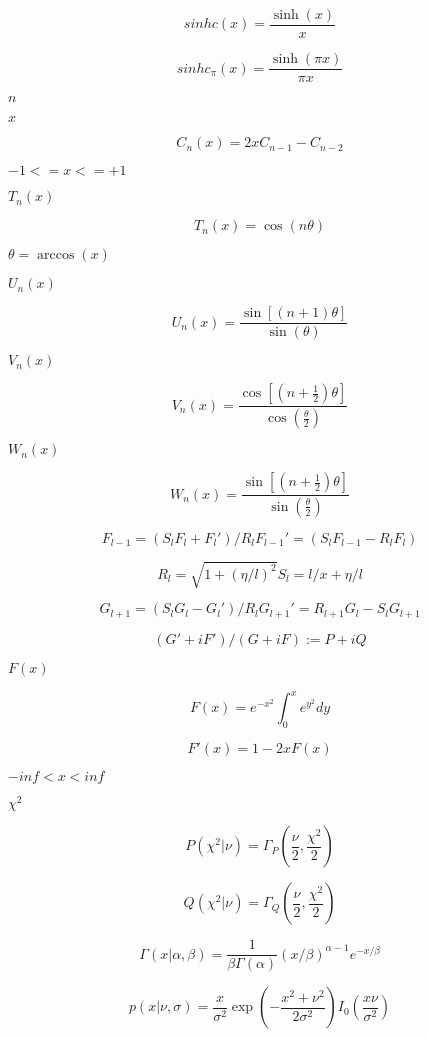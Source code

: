 \documentclass{article}
\begin{document}
\[ sinhc(x) = \frac{\sinh(x)}{x} \]
\pagebreak

\[ sinhc_\pi(x) = \frac{\sinh(\pi x)}{\pi x} \]
\pagebreak

$ n $
\pagebreak

$ x $
\pagebreak

\[ C_n(x) = 2xC_{n-1} - C_{n-2} \]
\pagebreak

$ -1 <= x <= +1 $
\pagebreak

$ T_n(x) $
\pagebreak

\[ T_n(x) = \cos(n \theta) \]
\pagebreak

$ \theta = \arccos(x) $
\pagebreak

$ U_n(x) $
\pagebreak

\[ U_n(x) = \frac{\sin \left[(n+1)\theta \right]}{\sin(\theta)} \]
\pagebreak

$ V_n(x) $
\pagebreak

\[ V_n(x) = \frac{\cos \left[ \left(n+\frac{1}{2}\right)\theta \right]} {\cos \left(\frac{\theta}{2}\right)} \]
\pagebreak

$ W_n(x) $
\pagebreak

\[ W_n(x) = \frac{\sin \left[ \left(n+\frac{1}{2}\right)\theta \right]} {\sin \left(\frac{\theta}{2}\right)} \]
\pagebreak

\[ F_{l-1} = (S_l F_l + F_l') / R_l F_{l-1}' = (S_l F_{l-1} - R_l F_l) \]
\pagebreak

\[ R_l = \sqrt{1 + (\eta / l)^2} S_l = l / x + \eta / l \]
\pagebreak

\[ G_{l+1} = (S_l G_l - G_l')/R_l G_{l+1}' = R_{l+1} G_l - S_l G_{l+1} \]
\pagebreak

\[ (G' + i F') / (G + i F) := P + i Q \]
\pagebreak

$ F(x) $
\pagebreak

\[ F(x) = e^{-x^2} \int_0^x e^{y^2} dy \]
\pagebreak

\[ F'(x) = 1 - 2xF(x) \]
\pagebreak

$ -inf < x < inf $
\pagebreak

$ \chi^2 $
\pagebreak

\[ P(\chi^2|\nu) = \Gamma_P(\frac{\nu}{2}, \frac{\chi^2}{2}) \]
\pagebreak

\[ Q(\chi^2|\nu) = \Gamma_Q(\frac{\nu}{2}, \frac{\chi^2}{2}) \]
\pagebreak

\[ \Gamma(x|\alpha,\beta) = \frac{1}{\beta\Gamma(\alpha)} (x/\beta)^{\alpha - 1} e^{-x/\beta} \]
\pagebreak

\[ p(x|\nu,\sigma) = \frac{x}{\sigma^2} \exp\left(-\frac{x^2+\nu^2}{2\sigma^2}\right) I_0\left(\frac{x \nu}{\sigma^2}\right) \]
\pagebreak
\end{document}
